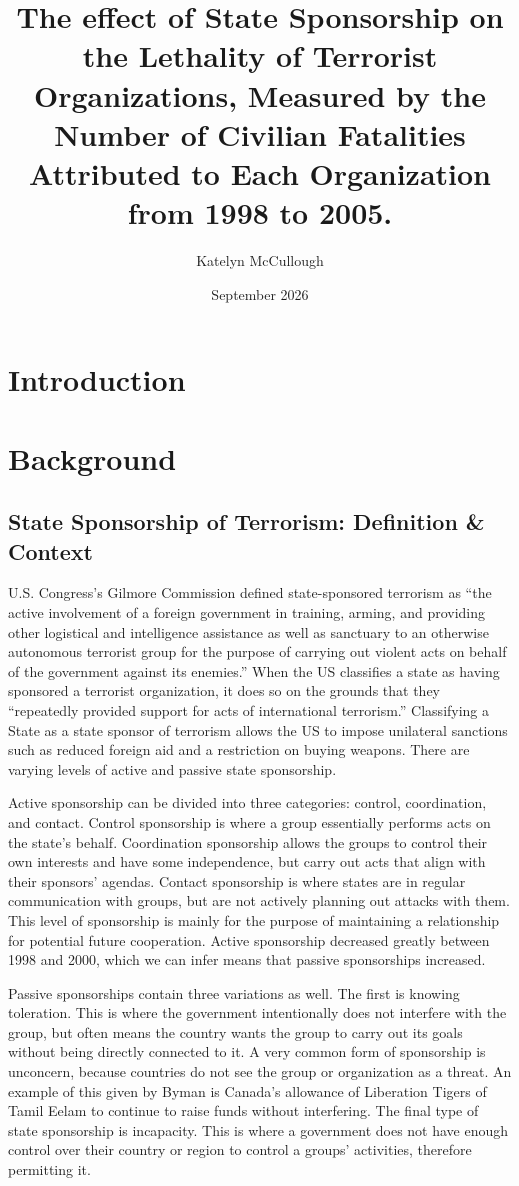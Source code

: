 \documentclass{article}
\title{The effect of State Sponsorship on the Lethality of Terrorist Organizations, Measured by the Number of Civilian Fatalities Attributed to Each Organization from 1998 to 2005.}
\author{Katelyn McCullough}
\date{September 2026}
\begin{document}
\maketitle

\section{Introduction}
\section{Background}
\subsection{State Sponsorship of Terrorism: Definition \& Context}

U.S. Congress's Gilmore Commission defined state-sponsored terrorism as ``the active involvement of a foreign government in training, arming, and providing other logistical and intelligence assistance as well as sanctuary to an otherwise autonomous terrorist group for the purpose of carrying out violent acts on behalf of the government against its enemies.'' \cite{gilmore1999assessing} When the US classifies a state as having sponsored a terrorist organization, it does so on the grounds that they ``repeatedly provided support for acts of international terrorism.'' \cite{usc22_2656f} Classifying a State as a state sponsor of terrorism allows the US to impose unilateral sanctions such as reduced foreign aid and a restriction on buying weapons. There are varying levels of active and passive state sponsorship.

Active sponsorship can be divided into three categories: control, coordination, and contact. Control sponsorship is where a group essentially performs acts on the state's behalf. Coordination sponsorship allows the groups to control their own interests and have some independence, but carry out acts that align with their sponsors' agendas. Contact sponsorship is where states are in regular communication with groups, but are not actively planning out attacks with them. This level of sponsorship is mainly for the purpose of maintaining a relationship for potential future cooperation. Active sponsorship decreased greatly between 1998 and 2000, which we can infer means that passive sponsorships increased.

Passive sponsorships contain three variations as well. The first is knowing toleration. This is where the government intentionally does not interfere with the group, but often means the country wants the group to carry out its goals without being directly connected to it. A very common form of sponsorship is unconcern, because countries do not see the group or organization as a threat. An example of this given by Byman is Canada's allowance of Liberation Tigers of Tamil Eelam to continue to raise funds without interfering. The final type of state sponsorship is incapacity. This is where a government does not have enough control over their country or region to control a groups' activities, therefore permitting it. \cite{article}
\end{document}
